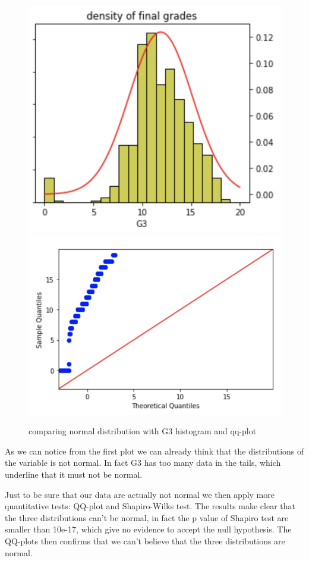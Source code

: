 \documentclass[a4paper, 11pt]{report}
\theoremstyle{definition}
\numberwithin{equation}{section}		%
\numberwithin{figure}{section}			%
\numberwithin{table}{section}				%
\begin{document}
\begin{figure}[h]
\includegraphics[scale=0.5]{G3_distribution.png}
\includegraphics[scale=0.5]{qq-plot_G3.png}
\caption{comparing normal distribution with G3 histogram and qq-plot}
\end{figure}

As we can notice from the first plot we can already think that the distributions of the variable is not normal. In fact G3 has too many data in the tails, which underline that it must not be normal.

Just to be sure that our data are actually not normal we then apply more quantitative tests: QQ-plot and Shapiro-Wilks test.
The results make clear that the three distributions can't be normal, in fact the p value of Shapiro test are smaller than 10e-17, which give no evidence to accept the null hypothesis. The QQ-plots then confirms that we can't believe that the three distributions are normal.
\end{document}

